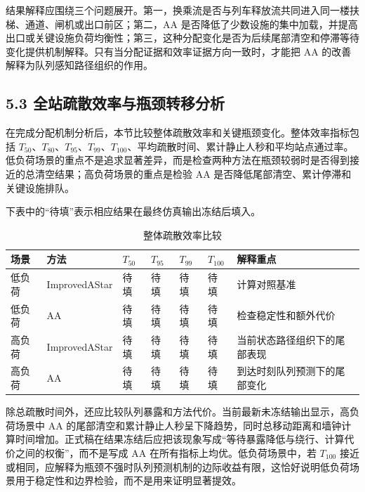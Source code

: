 \documentclass[UTF8,a4paper,12pt]{ctexart}
\begin{document}
结果解释应围绕三个问题展开。第一，换乘流是否与列车释放流共同进入同一楼扶梯、通道、闸机或出口前区；第二，AA 是否降低了少数设施的集中加载，并提高出口或关键设施负荷均衡性；第三，这种分配变化是否为后续尾部清空和停滞等待变化提供机制解释。只有当分配证据和效率证据方向一致时，才能把 AA 的改善解释为队列感知路径组织的作用。

\subsection{5.3 全站疏散效率与瓶颈转移分析}

在完成分配机制分析后，本节比较整体疏散效率和关键瓶颈变化。整体效率指标包括 \(T_{50}\)、\(T_{80}\)、\(T_{95}\)、\(T_{99}\)、\(T_{100}\)、平均疏散时间、累计静止人秒和平均站点通过率。低负荷场景的重点不是追求显著差异，而是检查两种方法在瓶颈较弱时是否得到接近的总清空结果；高负荷场景的重点是检验 AA 是否降低尾部清空、累计停滞和关键设施排队。

下表中的“待填”表示相应结果在最终仿真输出冻结后填入。

\begin{table}[htbp]
\centering
\caption{整体疏散效率比较}
\small
\begin{tabular}{p{}p{}p{}p{}p{}p{}p{}}
\toprule
场景 & 方法 & \(T_{50}\) & \(T_{95}\) & \(T_{99}\) & \(T_{100}\) & 解释重点 \\
\midrule
低负荷 & ImprovedAStar & 待填 & 待填 & 待填 & 待填 & 计算对照基准 \\
低负荷 & AA & 待填 & 待填 & 待填 & 待填 & 检查稳定性和额外代价 \\
高负荷 & ImprovedAStar & 待填 & 待填 & 待填 & 待填 & 当前状态路径组织下的尾部表现 \\
高负荷 & AA & 待填 & 待填 & 待填 & 待填 & 到达时刻队列预测下的尾部变化 \\
\bottomrule
\end{tabular}
\end{table}

除总疏散时间外，还应比较队列暴露和方法代价。当前最新未冻结输出显示，高负荷场景中 AA 的尾部清空和累计静止人秒呈下降趋势，同时总移动距离和墙钟计算时间增加。正式稿在结果冻结后应把该现象写成“等待暴露降低与绕行、计算代价之间的权衡”，而不是写成 AA 在所有指标上均优。低负荷场景中，若 \(T_{100}\) 接近或相同，应解释为瓶颈不强时队列预测机制的边际收益有限，这恰好说明低负荷场景用于稳定性和边界检验，而不是用来证明显著提效。
\end{document}
